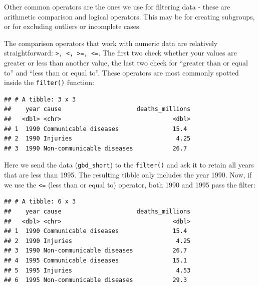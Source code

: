 \documentclass[
  12pt,
  krantz2]{krantz}
\makeatletter
\newenvironment{Shaded}{\begin{snugshade}}{\end{snugshade}}
\newcommand{\DecValTok}[1]{\textcolor[rgb]{0.00,0.00,0.81}{#1}}
\newcommand{\KeywordTok}[1]{\textcolor[rgb]{0.13,0.29,0.53}{\textbf{#1}}}
\newcommand{\NormalTok}[1]{#1}
\newcommand{\OperatorTok}[1]{\textcolor[rgb]{0.81,0.36,0.00}{\textbf{#1}}}
\newcommand{\StringTok}[1]{\textcolor[rgb]{0.31,0.60,0.02}{#1}}
\newenvironment{kframe}{%
\medskip{}
\setlength{\fboxsep}{.8em}
 \def\at@end@of@kframe{}%
 \ifinner\ifhmode%
  \def\at@end@of@kframe{\end{minipage}}%
  \begin{minipage}{\columnwidth}%
 \fi\fi%
 \def\FrameCommand##1{\hskip\@totalleftmargin \hskip-\fboxsep
 \colorbox{shadecolor}{##1}\hskip-\fboxsep
     \hskip-\linewidth \hskip-\@totalleftmargin \hskip\columnwidth}%
 \MakeFramed {\advance\hsize-\width
   \@totalleftmargin\z@ \linewidth\hsize
   \@setminipage}}%
 {\par\unskip\endMakeFramed%
 \at@end@of@kframe}
\renewenvironment{Shaded}{\begin{kframe}}{\end{kframe}}
\makeatother
\begin{document}
Other common operators are the ones we use for filtering data - these are arithmetic comparison and logical operators.
This may be for creating subgroups, or for excluding outliers or incomplete cases.

The comparison operators that work with numeric data are relatively straightforward: \texttt{\textgreater{},\ \textless{},\ \textgreater{}=,\ \textless{}=}.
The first two check whether your values are greater or less than another value, the last two check for ``greater than or equal to'' and ``less than or equal to''.
These operators are most commonly spotted inside the \texttt{filter()} function:

\begin{Shaded}
\end{Shaded}

\begin{verbatim}
## # A tibble: 3 x 3
##    year cause                     deaths_millions
##   <dbl> <chr>                               <dbl>
## 1  1990 Communicable diseases               15.4 
## 2  1990 Injuries                             4.25
## 3  1990 Non-communicable diseases           26.7
\end{verbatim}

Here we send the data (\texttt{gbd\_short}) to the \texttt{filter()} and ask it to retain all years that are less than 1995.
The resulting tibble only includes the year 1990.
Now, if we use the \texttt{\textless{}=} (less than or equal to) operator, both 1990 and 1995 pass the filter:

\begin{Shaded}
\end{Shaded}

\begin{verbatim}
## # A tibble: 6 x 3
##    year cause                     deaths_millions
##   <dbl> <chr>                               <dbl>
## 1  1990 Communicable diseases               15.4 
## 2  1990 Injuries                             4.25
## 3  1990 Non-communicable diseases           26.7 
## 4  1995 Communicable diseases               15.1 
## 5  1995 Injuries                             4.53
## 6  1995 Non-communicable diseases           29.3
\end{verbatim}
\end{document}
